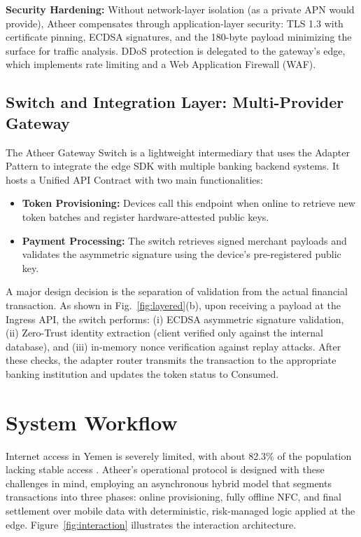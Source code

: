 \documentclass[conference,10pt]{IEEEtran}
\begin{document}
\textbf{Security Hardening:} Without network-layer isolation (as a private APN would provide), Atheer compensates through application-layer security: TLS 1.3 \cite{rfc8446} with certificate pinning, ECDSA signatures, and the 180-byte payload minimizing the surface for traffic analysis. DDoS protection is delegated to the gateway's edge, which implements rate limiting and a Web Application Firewall (WAF).

\subsection{Switch and Integration Layer: Multi-Provider Gateway}

The Atheer Gateway Switch is a lightweight intermediary that uses the Adapter Pattern to integrate the edge SDK with multiple banking backend systems. It hosts a Unified API Contract with two main functionalities:

\begin{itemize}
\item \textbf{Token Provisioning:} Devices call this endpoint when online to retrieve new token batches and register hardware-attested public keys.

\item \textbf{Payment Processing:} The switch retrieves signed merchant payloads and validates the asymmetric signature using the device's pre-registered public key.
\end{itemize}

A major design decision is the separation of validation from the actual financial transaction. As shown in Fig.~\ref{fig:layered}(b), upon receiving a payload at the Ingress API, the switch performs: (i) ECDSA asymmetric signature validation, (ii) Zero-Trust identity extraction (client verified only against the internal database), and (iii) in-memory nonce verification against replay attacks. After these checks, the adapter router transmits the transaction to the appropriate banking institution and updates the token status to Consumed.

\section{System Workflow}

Internet access in Yemen is severely limited, with about 82.3\% of the population lacking stable access \cite{datareportal2024}. Atheer's operational protocol is designed with these challenges in mind, employing an asynchronous hybrid model that segments transactions into three phases: online provisioning, fully offline NFC, and final settlement over mobile data with deterministic, risk-managed logic applied at the edge. Figure~\ref{fig:interaction} illustrates the interaction architecture.
\end{document}
